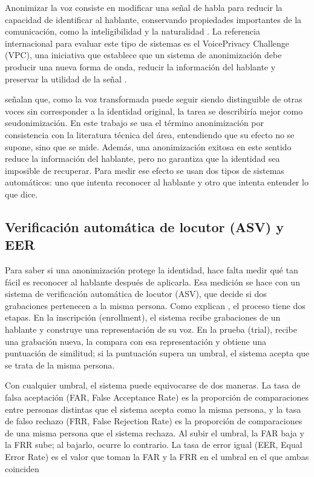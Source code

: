 \documentclass[10pt,twocolumn]{article}
\newcommand{\textcite}[1]{\citet{#1}}
\newcommand{\parencite}[1]{\citep{#1}}
\begin{document}
Anonimizar la voz consiste en modificar una señal de habla para reducir la capacidad de identificar al hablante, conservando propiedades importantes de la comunicación, como la inteligibilidad y la naturalidad \parencite{patino2021}. La referencia internacional para evaluar este tipo de sistemas es el VoicePrivacy Challenge (VPC), una iniciativa que establece que un sistema de anonimización debe producir una nueva forma de onda, reducir la información del hablante y preservar la utilidad de la señal \parencite{tomashenko2024}.

\textcite{patino2021} señalan que, como la voz transformada puede seguir siendo distinguible de otras voces sin corresponder a la identidad original, la tarea se describiría mejor como seudonimización. En este trabajo se usa el término anonimización por consistencia con la literatura técnica del área, entendiendo que su efecto no se supone, sino que se mide. Además, una anonimización exitosa en este sentido reduce la información del hablante, pero no garantiza que la identidad sea imposible de recuperar. Para medir ese efecto se usan dos tipos de sistemas automáticos: uno que intenta reconocer al hablante y otro que intenta entender lo que dice.

\subsection{Verificación automática de locutor (ASV) y EER}\label{sec:2.3}

Para saber si una anonimización protege la identidad, hace falta medir qué tan fácil es reconocer al hablante después de aplicarla. Esa medición se hace con un sistema de verificación automática de locutor (ASV), que decide si dos grabaciones pertenecen a la misma persona. Como explican \textcite{deng2023}, el proceso tiene dos etapas. En la inscripción (enrollment), el sistema recibe grabaciones de un hablante y construye una representación de su voz. En la prueba (trial), recibe una grabación nueva, la compara con esa representación y obtiene una puntuación de similitud; si la puntuación supera un umbral, el sistema acepta que se trata de la misma persona.

Con cualquier umbral, el sistema puede equivocarse de dos maneras. La tasa de falsa aceptación (FAR, False Acceptance Rate) es la proporción de comparaciones entre personas distintas que el sistema acepta como la misma persona, y la tasa de falso rechazo (FRR, False Rejection Rate) es la proporción de comparaciones de una misma persona que el sistema rechaza. Al subir el umbral, la FAR baja y la FRR sube; al bajarlo, ocurre lo contrario. La tasa de error igual (EER, Equal Error Rate) es el valor que toman la FAR y la FRR en el umbral en el que ambas coinciden
\end{document}
